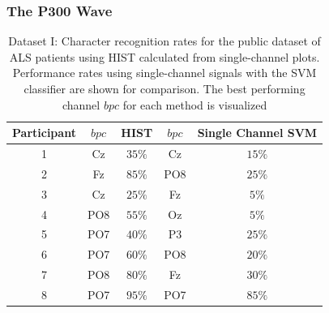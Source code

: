 \documentclass[aspectratio=169]{beamer}
\begin{document}
\begin{frame}
\frametitle{The P300 Wave}
\begin{center}
\begin{table}[h!]
\caption[Dataset I - Single Channel Character Recognition Rates]{Dataset I: Character recognition rates for the public dataset of ALS patients using HIST calculated from single-channel plots.  Performance rates using single-channel signals with the SVM classifier are shown for comparison.  The best performing channel $bpc$ for each method is visualized}
\centering
\begin{tabular}{c|cc|cc}
\toprule
\textbf{Participant}	&  $bpc$ 	&  HIST &  $bpc$	&  Single Channel SVM \\
\midrule
1     &     Cz   &   $35\%$    &  Cz   & $15\%$   \\
2     &     Fz   &   $85\%$      &  PO8   & $25\%$   \\
3     &     Cz   &   $25\%$    &  Fz   & $5\%$   \\
4     &     PO8 &   $55\%$   &  Oz   & $5\%$    \\
5     &     PO7 &   $40\%$    &  P3   & $25\%$   \\
6     &     PO7 &   $60\%$  &  PO8   & $20\%$    \\
7     &     PO8 &   $80\%$   &  Fz   & $30\%$     \\
8     &     PO7 &   $95\%$     &  PO7   & $85\%$ \\

\end{tabular}
\label{tab:resultsals}
\end{table}
\end{center}
\end{frame} 
\end{document}
